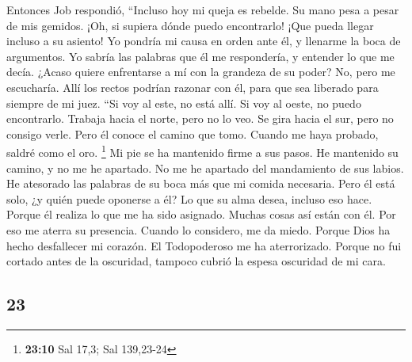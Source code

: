 \begin{paracol}{2}
 Entonces Job respondió,  ``Incluso hoy mi
queja es rebelde. Su mano pesa a pesar de mis gemidos. 
¡Oh, si supiera dónde puedo encontrarlo! ¡Que pueda llegar incluso a su
asiento!  Yo pondría mi causa en orden ante él, y llenarme
la boca de argumentos.  Yo sabría las palabras que él me
respondería, y entender lo que me decía.  ¿Acaso quiere
enfrentarse a mí con la grandeza de su poder? No, pero me escucharía.
 Allí los rectos podrían razonar con él, para que sea
liberado para siempre de mi juez.  ``Si voy al este, no
está allí. Si voy al oeste, no puedo encontrarlo.  Trabaja
hacia el norte, pero no lo veo. Se gira hacia el sur, pero no consigo
verle.  Pero él conoce el camino que tomo. Cuando me haya
probado, saldré como el oro. \footnote{\textbf{23:10} Sal 17,3; Sal
  139,23-24}  Mi pie se ha mantenido firme a sus pasos.
He mantenido su camino, y no me he apartado.  No me he
apartado del mandamiento de sus labios. He atesorado las palabras de su
boca más que mi comida necesaria.  Pero él está solo, ¿y
quién puede oponerse a él? Lo que su alma desea, incluso eso hace.
 Porque él realiza lo que me ha sido asignado. Muchas
cosas así están con él.  Por eso me aterra su presencia.
Cuando lo considero, me da miedo.  Porque Dios ha hecho
desfallecer mi corazón. El Todopoderoso me ha aterrorizado.
 Porque no fui cortado antes de la oscuridad, tampoco
cubrió la espesa oscuridad de mi cara.

\switchcolumn
\begin{otherlanguage}{english}

\hypertarget{section-45}{%
\section{23}\label{section-45}}


\end{otherlanguage}
\end{paracol}
